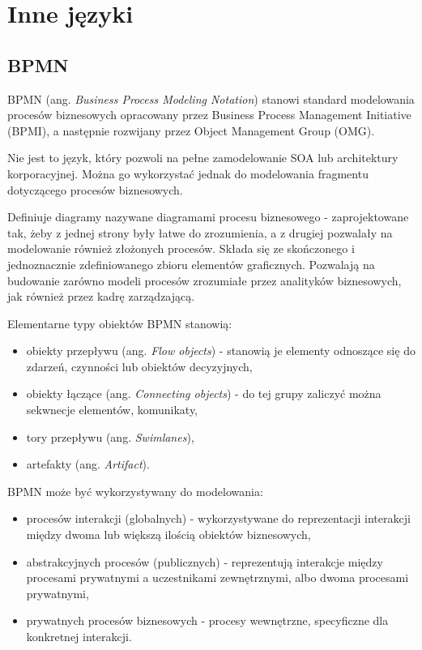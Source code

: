 \section{Inne języki}

\subsection{BPMN}
BPMN (ang. \textit{Business Process Modeling Notation}) stanowi standard modelowania procesów biznesowych opracowany przez Business Process Management Initiative (BPMI), a następnie rozwijany przez Object Management Group (OMG). 

Nie jest to język, który pozwoli na pełne zamodelowanie SOA lub architektury korporacyjnej. Można go wykorzystać jednak do modelowania fragmentu dotyczącego procesów biznesowych.

Definiuje diagramy nazywane diagramami procesu biznesowego - zaprojektowane tak, żeby z jednej strony były łatwe do zrozumienia, a z drugiej pozwalały na modelowanie również złożonych procesów. Składa się ze skończonego i jednoznacznie zdefiniowanego zbioru elementów graficznych. Pozwalają na budowanie zarówno modeli procesów zrozumiałe przez analityków biznesowych, jak również przez kadrę zarządzającą.

Elementarne typy obiektów BPMN stanowią: 
\begin{itemize}
\item{obiekty przepływu (ang. \emph{Flow objects}) - stanowią je elementy odnoszące się do zdarzeń, czynności lub obiektów decyzyjnych}, 
\item{obiekty łączące (ang. \emph{Connecting objects})} - do tej grupy zaliczyć można sekwnecje elementów, komunikaty, 
\item{tory przepływu (ang. \emph{Swimlanes})},
\item{artefakty (ang. \emph{Artifact})}.
\end{itemize}

BPMN może być wykorzystywany do modelowania:
\begin{itemize}
\item{procesów interakcji (globalnych) - wykorzystywane do reprezentacji interakcji między dwoma lub większą ilością obiektów biznesowych,}
\item{abstrakcyjnych procesów (publicznych) - reprezentują interakcje między procesami prywatnymi a uczestnikami zewnętrznymi, albo dwoma procesami prywatnymi,}
\item{prywatnych procesów biznesowych - procesy wewnętrzne, specyficzne dla konkretnej interakcji.}
\end{itemize}

